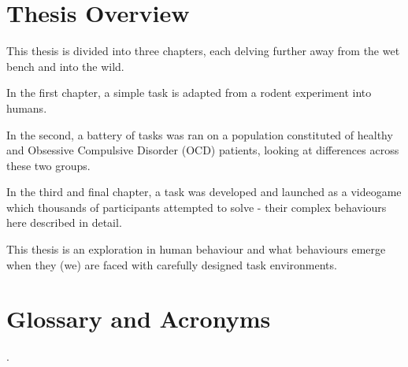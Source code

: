 \documentclass[11pt]{article}
\begin{document}
\section*{Thesis Overview}
This thesis is divided into three chapters, each delving further away from the wet bench and into the wild.

In the first chapter, a simple task is adapted from a rodent experiment into humans.

In the second, a battery of tasks was ran on a population constituted of healthy and Obsessive Compulsive Disorder (OCD) patients, looking at differences across these two groups.

In the third and final chapter, a task was developed and launched as a videogame which thousands of participants attempted to solve - their complex behaviours here described in detail.

This thesis is an exploration in human behaviour and what behaviours emerge when they (we) are faced with carefully designed task environments.

\clearpage

\tableofcontents
\clearpage

\listoffigures
\clearpage

\listoftables
\clearpage

\section*{Glossary and Acronyms}

.
\end{document}
